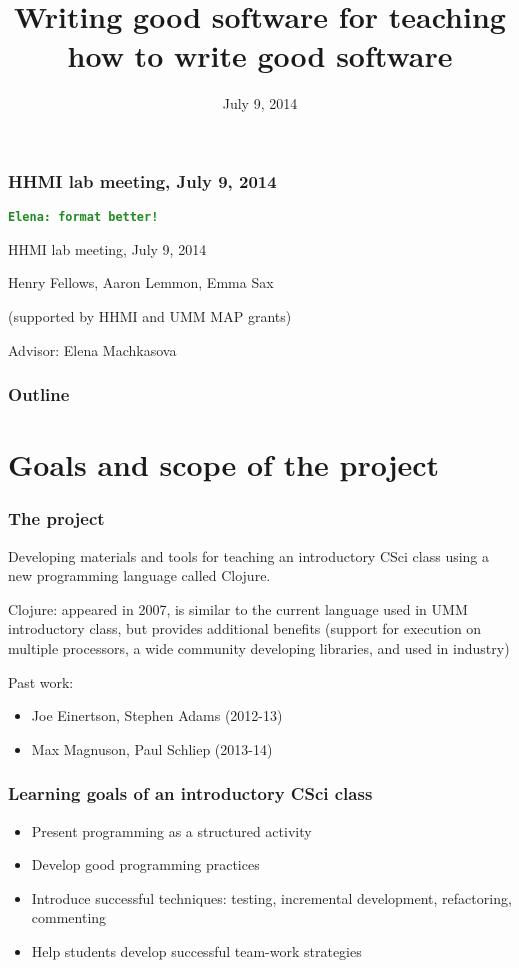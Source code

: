 \documentclass{beamer}
\newcommand{\comment}[1]{{\bf \tt  {#1}}}
\newcommand{\emcomment}[1]{\textcolor{ForestGreen}{\comment{Elena: {#1}}}}
\begin{document}
\title{Writing good software for teaching how to write good software}
\date{July 9, 2014}

\begin{frame}
\frametitle{HHMI lab meeting, July 9, 2014}
\emcomment{format better!}

{\centering
HHMI lab meeting, July 9, 2014 \par
}
{\centering
Henry Fellows, Aaron Lemmon, Emma Sax \par
}
{\centering 
(supported by HHMI and UMM MAP grants)\par
}
{\centering
Advisor: Elena Machkasova \par
}
\end{frame}

\begin{frame}[fragile]
\frametitle{Outline}
	\tableofcontents
\end{frame}


\section{Goals and scope of the project}

\begin{frame}[fragile]
\frametitle{The project}
Developing materials and tools for teaching an introductory CSci class using a new programming language called Clojure.

Clojure: appeared in 2007, is similar to the current language used in UMM introductory class, but provides additional benefits 
(support for execution on multiple processors, a wide community developing libraries, and used in industry)

Past work: 
\begin{itemize}
\item Joe Einertson, Stephen Adams (2012-13)
\item  Max Magnuson, Paul Schliep (2013-14)
\end{itemize}  
\end{frame}

\begin{frame}[fragile]
\frametitle{Learning goals of an introductory CSci class}
\begin{itemize}
\item Present programming as a structured activity
\item Develop good programming practices
\item Introduce successful techniques: testing, incremental development, refactoring, commenting 
\item Help students develop successful team-work strategies
\end{itemize}
\end{frame}
\end{document}
